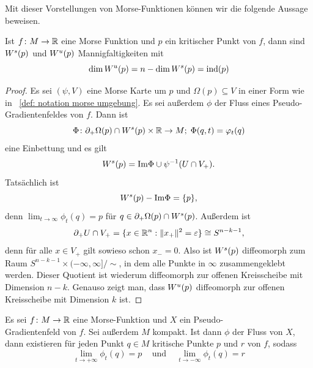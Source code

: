 Mit dieser Vorstellungen von Morse-Funktionen können wir die folgende Aussage beweisen.

\begin{prop}
    Ist $f \colon M \to { \mathbb R }$ eine Morse Funktion und $p$ ein kritischer Punkt von $f$, dann sind
    ${ W^s } (p)$ und ${ W^u } (p)$ Mannigfaltigkeiten mit 
    \[ \dim { W^u } (p) = n - \dim { W^s } (p) = { \operatorname{ind} } (p) \]
\end{prop}

\begin{proof}
    Es sei $(\psi, V)$ eine Morse Karte um $p$ und $\Omega(p) \subseteq V$ in einer Form wie 
    in ~\ref{def: notation morse umgebung}. Es sei außerdem $\phi$ der Fluss eines 
    Pseudo-Gradientenfeldes von $f$. Dann ist 
    \[ \Phi \colon { \partial }_+ \Omega (p) \cap { W^s } (p) \times { \mathbb R } \to M ; \; \Phi (q, t) = \varphi_t(q) \]
    eine Einbettung und es gilt 
    \[ { W^s } (p) = { \operatorname{Im} } \Phi \cup \psi^{-1}(U \cap V_+) . \]
    Tatsächlich ist 
    \[ { W^s } (p) - { \operatorname{Im} } \Phi = \{ p \} , \]
    denn $\lim_{t \to \infty} \phi_t(q) = p$ für $q \in { \partial }_+ \Omega (p) \cap { W^s } (p)$. 
    Außerdem ist 
    \[ { \partial }_+ U \cap V_+ = \{ x \in { \mathbb R }^n: \| x_+ \|^2 = \varepsilon \} \cong S^{n - k - 1} , \] 
    denn für alle $x \in V_+$ gilt sowieso schon $x_- = 0$. Also ist ${ W^s }(p)$ diffeomorph zum Raum 
    $S^{n - k - 1} \times (-\infty, \infty]/\sim$, in dem alle Punkte in $\infty$ zusammengeklebt 
    werden. Dieser Quotient ist wiederum diffeomorph zur offenen Kreisscheibe mit Dimension $n - k$.
    Genauso zeigt man, dass ${ W^u } (p)$ diffeomorph zur offenen Kreisscheibe mit Dimension $k$ ist.
\end{proof}

\begin{prop}
    \label{prop: trajektorien enden in kritischen punkten}
    Es sei $f \colon M \to { \mathbb R }$ eine Morse-Funktion und $X$ ein Pseudo-\\Gradientenfeld von $f$. 
    Sei außerdem $M$ kompakt. Ist dann $\phi$ der Fluss von $X$, dann existieren für jeden Punkt 
    $q \in M$ kritische Punkte $p$ und $r$ von $f$, sodass
    \[ \lim_{t \to + \infty} \phi_t(q) = p \;\;\; 
    \text{ und } \;\;\; \lim_{t \to -\infty} \phi_t(q) = r \]
\end{prop}

